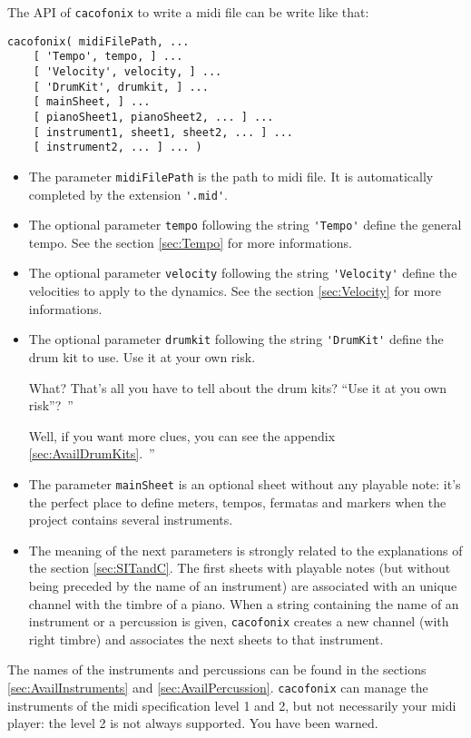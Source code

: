 \documentclass{article}
\newenvironment{meenv}{ \par \noindent \makebox[6em][r]{ \textcolor{mecolor}{Me}: `` --~}}{~''}
\newenvironment{myselfenv}{ \par \noindent \makebox[6em][r]{ \textcolor{myselfcolor}{Myself}: `` --~}}{~''}
\newcommand{\me}[1]{\begin{meenv}#1\end{meenv}}
\newcommand{\myself}[1]{\begin{myselfenv}#1\end{myselfenv}}
\begin{document}
The API of \lstinline!cacofonix! to write a midi file can be write like that:
\begin{lstlisting}
cacofonix( midiFilePath, ...
	[ 'Tempo', tempo, ] ...
	[ 'Velocity', velocity, ] ...
	[ 'DrumKit', drumkit, ] ...
	[ mainSheet, ] ...
	[ pianoSheet1, pianoSheet2, ... ] ...
	[ instrument1, sheet1, sheet2, ... ] ...
	[ instrument2, ... ] ... )
\end{lstlisting}
\begin{itemize}
	\item The parameter \lstinline!midiFilePath! is the path to midi file. It is automatically completed by the extension \lstinline!'.mid'!.
	\item The optional parameter \lstinline!tempo! following the string \lstinline!'Tempo'! define the general tempo. See the section \ref{sec:Tempo} for more informations.
	\item The optional parameter \lstinline!velocity! following the string \lstinline!'Velocity'! define the velocities to apply to the dynamics. See the section \ref{sec:Velocity} for more informations.
	\item The optional parameter \lstinline!drumkit! following the string \lstinline!'DrumKit'! define the drum kit to use. Use it at your own risk.
		\myself{What? That's all you have to tell about the drum kits? ``Use it at you own risk''?}
		\me{Well, if you want more clues, you can see the appendix \ref{sec:AvailDrumKits}.}
	\item The parameter \lstinline!mainSheet! is an optional sheet without any playable note: it's the perfect place to define meters, tempos, fermatas and markers when the project contains several instruments.
	\item The meaning of the next parameters is strongly related to the explanations of the section \ref{sec:SITandC}. The first sheets with playable notes (but without being preceded by the name of an instrument) are associated with an unique channel with the timbre of a piano. When a string containing the name of an instrument or a percussion is given, \lstinline!cacofonix! creates a new channel (with right timbre) and associates the next sheets to that instrument.
\end{itemize}

The names of the instruments and percussions can be found in the sections \ref{sec:AvailInstruments} and \ref{sec:AvailPercussion}. \lstinline!cacofonix! can manage the instruments of the midi specification level 1 and 2, but not necessarily your midi player: the level 2 is not always supported. You have been warned. 
\end{document}
